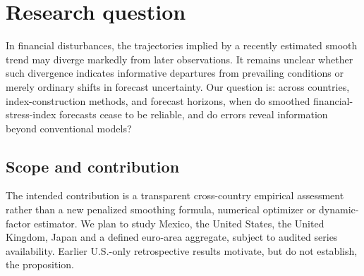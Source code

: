 \section{Research question}
In financial disturbances, the trajectories implied by a recently estimated
smooth trend may diverge markedly from later observations. It remains unclear
whether such divergence indicates informative departures from prevailing
conditions or merely ordinary shifts in forecast uncertainty.
Our question is: across countries, index-construction methods, and forecast
horizons, when do smoothed financial-stress-index forecasts cease to be
reliable, and do errors reveal information beyond conventional models?

\subsection{Scope and contribution}
The intended contribution is a transparent cross-country empirical assessment
rather than a new penalized smoothing formula, numerical optimizer or
dynamic-factor estimator. We plan to study Mexico, the United States,
the United Kingdom, Japan and a defined euro-area aggregate, subject to
audited series availability. Earlier U.S.-only retrospective results motivate,
but do not establish, the proposition.
